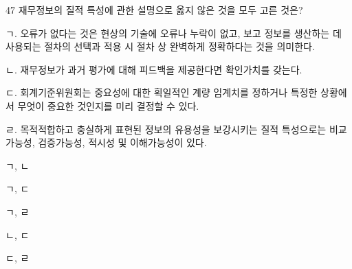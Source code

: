 \begin{question}{47}
재무정보의 질적 특성에 관한 설명으로 옳지 않은 것을 모두 고른 것은?
\begin{framedtext}
ㄱ. 오류가 없다는 것은 현상의 기술에 오류나 누락이 없고, 보고 정보를 생산하는 데 사용되는 절차의 선택과 적용 시 절차 상 완벽하게 정확하다는 것을 의미한다. \par
ㄴ. 재무정보가 과거 평가에 대해 피드백을 제공한다면 확인가치를 갖는다. \par
ㄷ. 회계기준위원회는 중요성에 대한 획일적인 계량 임계치를 정하거나 특정한 상황에서 무엇이 중요한 것인지를 미리 결정할 수 있다. \par
ㄹ. 목적적합하고 충실하게 표현된 정보의 유용성을 보강시키는 질적 특성으로는 비교가능성, 검증가능성, 적시성 및 이해가능성이 있다. \par
\end{framedtext}
\begin{choices}
  \item ㄱ, ㄴ
  \item ㄱ, ㄷ
  \item ㄱ, ㄹ
  \item ㄴ, ㄷ
  \item ㄷ, ㄹ
\end{choices}
\end{question}
